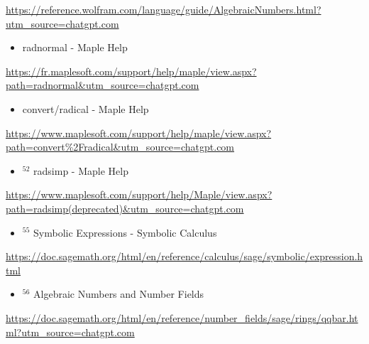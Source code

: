 \documentclass[10pt]{article}
\begin{document}
\href{https://reference.wolfram.com/language/guide/AlgebraicNumbers.html?utm_source=chatgpt.com}{https://reference.wolfram.com/language/guide/AlgebraicNumbers.html?utm\_source=chatgpt.com}

\begin{itemize}
  \item[50] radnormal - Maple Help
\end{itemize}

\href{https://fr.maplesoft.com/support/help/maple/view.aspx?path=radnormal&utm_source=chatgpt.com}{https://fr.maplesoft.com/support/help/maple/view.aspx?path=radnormal\&utm\_source=chatgpt.com}

\begin{itemize}
  \item[51] convert/radical - Maple Help
\end{itemize}

\href{https://www.maplesoft.com/support/help/maple/view.aspx?path=convert%2Fradical&utm_source=chatgpt.com}{https://www.maplesoft.com/support/help/maple/view.aspx?path=convert\%2Fradical\&utm\_source=chatgpt.com}

\begin{itemize}
  \item[] ${ }^{52}$ radsimp - Maple Help
\end{itemize}

\href{https://www.maplesoft.com/support/help/Maple/view.aspx?path=radsimp%28deprecated%29&utm_source=chatgpt.com}{https://www.maplesoft.com/support/help/Maple/view.aspx?path=radsimp(deprecated)\&utm\_source=chatgpt.com}

\begin{itemize}
  \item[] ${ }^{55}$ Symbolic Expressions - Symbolic Calculus
\end{itemize}

\href{https://doc.sagemath.org/html/en/reference/calculus/sage/symbolic/expression.html}{https://doc.sagemath.org/html/en/reference/calculus/sage/symbolic/expression.html}

\begin{itemize}
  \item[] ${ }^{56}$ Algebraic Numbers and Number Fields
\end{itemize}

\href{https://doc.sagemath.org/html/en/reference/number_fields/sage/rings/qqbar.html?utm_source=chatgpt.com}{https://doc.sagemath.org/html/en/reference/number\_fields/sage/rings/qqbar.html?utm\_source=chatgpt.com}
\end{document}
